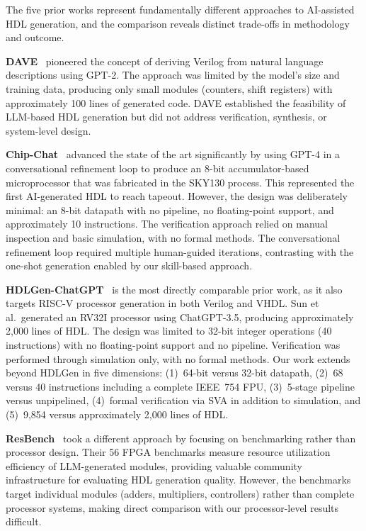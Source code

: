 \documentclass[journal]{IEEEtran}
\begin{document}
The five prior works represent fundamentally different approaches to
AI-assisted HDL generation, and the comparison reveals distinct
trade-offs in methodology and outcome.

\textbf{DAVE}~\cite{pearce2020dave} pioneered the concept of deriving
Verilog from natural language descriptions using GPT-2.  The approach
was limited by the model's size and training data, producing only small
modules (counters, shift registers) with approximately 100 lines of
generated code.  DAVE established the feasibility of LLM-based HDL
generation but did not address verification, synthesis, or system-level
design.

\textbf{Chip-Chat}~\cite{blocklove2023chipchat} advanced the state of
the art significantly by using GPT-4 in a conversational refinement loop
to produce an 8-bit accumulator-based microprocessor that was fabricated
in the SKY130 process.  This represented the first AI-generated HDL to
reach tapeout.  However, the design was deliberately minimal: an 8-bit
datapath with no pipeline, no floating-point support, and approximately
10 instructions.  The verification approach relied on manual inspection
and basic simulation, with no formal methods.  The conversational
refinement loop required multiple human-guided iterations, contrasting
with the one-shot generation enabled by our skill-based approach.

\textbf{HDLGen-ChatGPT}~\cite{sun2024hdlgen} is the most directly
comparable prior work, as it also targets RISC-V processor generation
in both Verilog and VHDL.  Sun et al.\ generated an RV32I processor
using ChatGPT-3.5, producing approximately 2,000 lines of HDL.  The
design was limited to 32-bit integer operations (40 instructions) with
no floating-point support and no pipeline.  Verification was performed
through simulation only, with no formal methods.  Our work extends
beyond HDLGen in five dimensions: (1)~64-bit versus 32-bit datapath,
(2)~68 versus 40 instructions including a complete IEEE~754 FPU,
(3)~5-stage pipeline versus unpipelined, (4)~formal verification via
SVA in addition to simulation, and (5)~9,854 versus approximately 2,000
lines of HDL.

\textbf{ResBench}~\cite{zhao2025resbench} took a different approach by
focusing on benchmarking rather than processor design.  Their 56 FPGA
benchmarks measure resource utilization efficiency of LLM-generated
modules, providing valuable community infrastructure for evaluating
HDL generation quality.  However, the benchmarks target individual
modules (adders, multipliers, controllers) rather than complete
processor systems, making direct comparison with our processor-level
results difficult.
\end{document}
